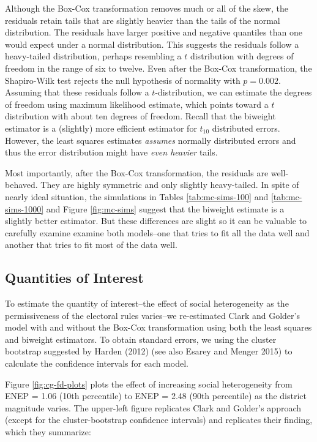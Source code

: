 \documentclass[12pt]{article}
\begin{document}
Although the Box-Cox transformation removes much or all of the skew, the residuals retain tails that are slightly heavier than the tails of the normal distribution. 
The residuals have larger positive and negative quantiles than one would expect under a normal distribution. 
This suggests the residuals follow a heavy-tailed distribution, perhaps resembling a $t$ distribution with degrees of freedom in the range of six to twelve. 
Even after the Box-Cox transformation, the Shapiro-Wilk test rejects the null hypothesis of normality with $p = 0.002$. 
Assuming that these residuals follow a $t$-distribution, we can estimate the degrees of freedom using maximum likelihood estimate, which points toward a $t$ distribution with about ten degrees of freedom. 
Recall that the biweight estimator is a (slightly) more efficient estimator for $t_{10}$ distributed errors. 
However, the least squares estimates \textit{assumes} normally distributed errors and thus the error distribution might have \textit{even heavier} tails.

Most importantly, after the Box-Cox transformation, the residuals are well-behaved. 
They are highly symmetric and only slightly heavy-tailed. 
In spite of nearly ideal situation, the simulations in Tables \ref{tab:mc-sims-100} and \ref{tab:mc-sims-1000} and Figure \ref{fig:mc-sims} suggest that the biweight estimate is a slightly better estimator. 
But these differences are slight so it can be valuable to carefully examine examine both models--one that tries to fit all the data well and another that tries to fit most of the data well.

\subsection*{Quantities of Interest}

To estimate the quantity of interest--the effect of social heterogeneity as the permissiveness of the electoral rules varies--we re-estimated Clark and Golder's model with and without the Box-Cox transformation using both the least squares and biweight estimators. 
To obtain standard errors, we using the cluster bootstrap suggested by Harden (2012) (see also Esarey and Menger 2015) to calculate the confidence intervals for each model.

Figure \ref{fig:cg-fd-plots} plots the effect of increasing social heterogeneity from ENEP = 1.06 (10th percentile) to ENEP = 2.48 (90th percentile) as the district magnitude varies. 
The upper-left figure replicates Clark and Golder's approach (except for the cluster-bootstrap confidence intervals) and replicates their finding, which they summarize:
\end{document}
